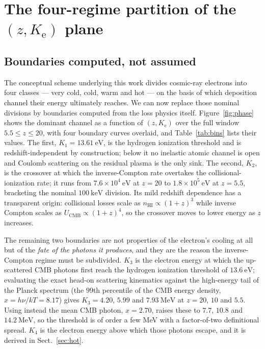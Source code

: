 \documentclass[twocolumn]{article}
\newcommand{\Ke}{K_{\mathrm{e}}}
\begin{document}
\section{The four-regime partition of the $(z,\Ke)$ plane}
\label{sec:bins}

\subsection{Boundaries computed, not assumed}

The conceptual scheme underlying this work divides cosmic-ray electrons into
four classes --- very cold, cold, warm and hot --- on the basis of which
deposition channel their energy ultimately reaches. We can now replace those
nominal divisions by boundaries computed from the loss physics itself.
Figure~\ref{fig:phase} shows the dominant channel as a function of $(z,\Ke)$
over the full window $5.5 \le z \le 20$, with four boundary curves overlaid,
and Table~\ref{tab:bins} lists their values. The first, $K_1 = 13.61\
\mathrm{eV}$, is the hydrogen ionization threshold and is redshift-independent
by construction; below it no inelastic atomic channel is open and Coulomb
scattering on the residual plasma is the only sink. The second,
$K_2$, is the crossover at which the inverse-Compton rate overtakes the
collisional-ionization rate; it runs from $7.6\times10^{4}\ \mathrm{eV}$ at
$z = 20$ to $1.8\times10^{5}\ \mathrm{eV}$ at $z = 5.5$, bracketing the nominal
$100\ \mathrm{keV}$ division. Its mild redshift dependence has a transparent
origin: collisional losses scale as $n_{\mathrm{HI}} \propto (1+z)^{3}$ while
inverse Compton scales as $U_{\mathrm{CMB}} \propto (1+z)^{4}$, so the
crossover moves to lower energy as $z$ increases.

The remaining two boundaries are not properties of the electron's cooling at
all but of the \emph{fate of the photons it produces}, and they are the reason
the inverse-Compton regime must be subdivided. $K_3$ is the electron energy at
which the up-scattered CMB photons first reach the hydrogen ionization
threshold of $13.6\ \mathrm{eV}$; evaluating the exact head-on scattering
kinematics against the high-energy tail of the Planck spectrum (the $99$th
percentile of the CMB energy density, $x = h\nu/kT = 8.17$) gives
$K_3 = 4.20$, $5.99$ and $7.93\ \mathrm{MeV}$ at $z = 20$, $10$ and $5.5$.
Using instead the mean CMB photon, $x = 2.70$, raises these to $7.7$, $10.8$
and $14.2\ \mathrm{MeV}$, so the threshold is of order a few MeV with a
factor-of-two definitional spread. $K_4$ is the electron energy above which
those photons escape, and it is derived in Sect.~\ref{sec:hot}.
\end{document}
